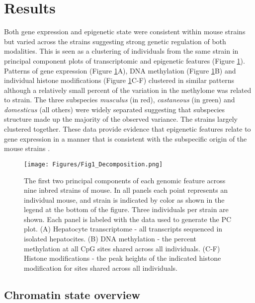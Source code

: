 \documentclass[
  11pt,
]{article}
\begin{document}
\hypertarget{results}{%
\section{Results}\label{results}}

Both gene expression and epigenetic state were consistent within mouse
strains but varied across the strains suggesting strong genetic
regulation of both modalities. This is seen as a clustering of
individuals from the same strain in principal component plots of
transcriptomic and epigenetic features (Figure \ref{fig:pc_plots}).
Patterns of gene expression (Figure \ref{fig:pc_plots}A), DNA
methylation (Figure \ref{fig:pc_plots}B) and individual histone
modifications (Figure \ref{fig:pc_plots}C-F) clustered in similar
patterns although a relatively small percent of the variation in the
methylome was related to strain. The three subspecies \textit{musculus}
(in red), \textit{castaneous} (in green) and \textit{domesticus} (all
others) were widely separated suggesting that subspecies structure made
up the majority of the observed variance. The  strains
largely clustered together. These data provide evidence that epigenetic
features relate to gene expression in a manner that is consistent with
the subspecific origin of the mouse strains \citep{yang2007subspecific}.

\begin{figure}[ht!]
\texttt{[image: Figures/Fig1\_Decomposition.png]} 
\caption{The first two principal components of each genomic feature across
nine inbred strains of mouse. In all panels each point represents
an individual mouse, and strain is indicated by color as shown in
the legend at the bottom of the figure. Three individuals per strain
are shown. Each panel is labeled with the data used to generate the 
PC plot. (A) Hepatocyte transcriptome - all transcripts sequenced in 
isolated hepatocites. (B) DNA methylation - the percent methylation at 
all CpG sites shared across all individuals. (C-F) Histone 
modifications - the peak heights of the indicated histone
modification for sites shared across all individuals.}
\label{fig:pc_plots}
\end{figure}

\hypertarget{chromatin-state-overview}{%
\subsection{Chromatin state overview}\label{chromatin-state-overview}}
\end{document}
